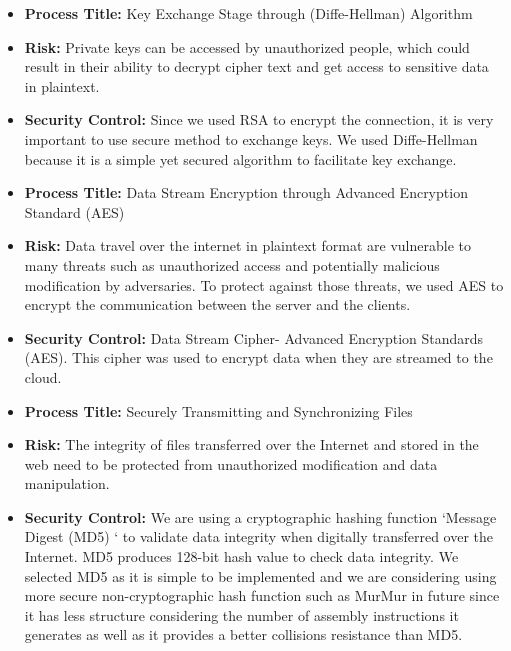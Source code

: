 \documentclass{article}
\begin{document}
\begin{enumerate}
\begin{itemize}
\item \textbf{Process Title:} Key Exchange Stage through (Diffe-Hellman) Algorithm
\item \textbf{Risk:} Private keys can be accessed by unauthorized people, which could result in their ability to decrypt cipher text and get access to sensitive data in plaintext.
\item \textbf{Security Control:} Since we used RSA to encrypt the connection, it is very important to use secure method to exchange keys. We used Diffe-Hellman because it is a simple yet secured algorithm to facilitate key exchange.

\item \textbf{Process Title:} Data Stream Encryption through Advanced Encryption Standard (AES)
\item \textbf{Risk:} Data travel over the internet in plaintext format are vulnerable to many threats such as unauthorized access and potentially malicious modification by adversaries. To protect against those threats, we used AES to encrypt the communication between the server and the clients.
\item \textbf{Security Control:} Data Stream Cipher- Advanced Encryption Standards (AES). This cipher was used to encrypt data when they are streamed to the cloud.

\item \textbf{Process Title:} Securely Transmitting and Synchronizing Files
\item \textbf{Risk:} The integrity of files transferred over the Internet and stored in the web need to be protected from unauthorized modification and data manipulation.
\item \textbf{Security Control:} We are using a cryptographic hashing function ‘Message Digest (MD5) ‘ to validate data integrity when digitally transferred over the Internet. MD5 produces 128-bit hash value to check data integrity. We selected MD5 as it is simple to be implemented and we are considering using more secure non-cryptographic hash function such as MurMur in future since it has less structure considering the number of assembly instructions it generates as well as it provides a better collisions resistance than MD5.

\end{itemize}


\end{enumerate}
\end{document}
